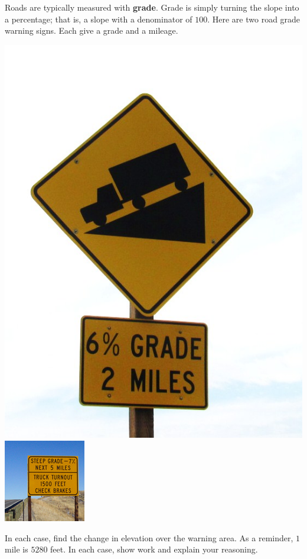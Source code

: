 \documentclass[noauthor,nooutcomes,hints,handout]{ximera}
\begin{document}
\begin{question}
Roads are typically measured with \textbf{grade}. Grade is simply
turning the slope into a percentage; that is, a slope with a
denominator of $100$.  Here are two road grade warning signs. Each
give a grade and a mileage.
\begin{center}
\includegraphics[width=.4\textwidth]{gradeWarning}
\includegraphics[width=.3\textwidth]{truckGradeWarning}
\end{center}
In each case, find the change in elevation over the warning area. As a
reminder, $1$ mile is $5280$ feet. In each case, show work and explain your reasoning. 

\end{question}
\end{document}
